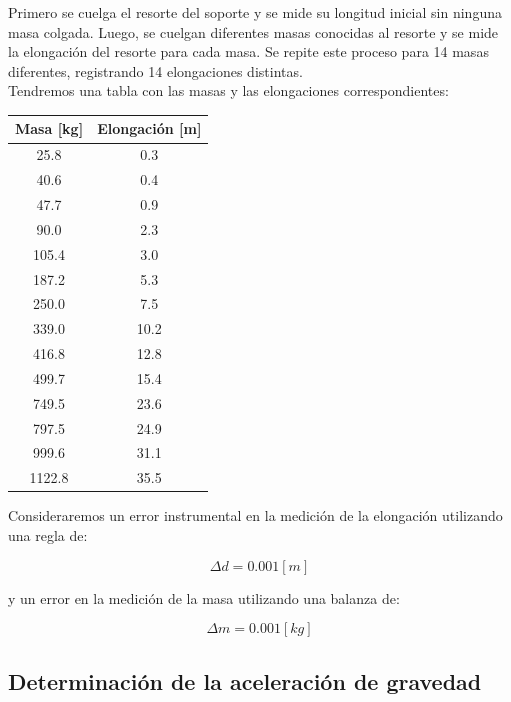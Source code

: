 \documentclass{article}
\begin{document}
\begin{multicols}{2}
    Primero se cuelga el resorte del soporte y se mide su longitud inicial sin ninguna masa colgada.
    Luego, se cuelgan diferentes masas conocidas al resorte y se mide la elongación del resorte 
    para cada masa. Se repite este proceso para 14 masas diferentes, registrando 14 elongaciones 
    distintas.
    \\ Tendremos una tabla con las masas y las elongaciones correspondientes:

    \begin{center}
        \begin{tabular}{|c|c|}
            \hline
            Masa [kg] & Elongación [m] \\
            \hline
            25.8 & 0.3 \\
            40.6 & 0.4 \\
            47.7 & 0.9 \\
            90.0 & 2.3 \\
            105.4 & 3.0 \\
            187.2 & 5.3 \\
            250.0 & 7.5 \\
            339.0 & 10.2 \\
            416.8 & 12.8 \\
            499.7 & 15.4 \\
            749.5 & 23.6 \\
            797.5 & 24.9 \\
            999.6 & 31.1 \\
            1122.8 & 35.5 \\
            \hline
        \end{tabular}
    \end{center}
    Consideraremos un error instrumental en la medición de la elongación utilizando una regla
    de:
    
    \begin{equation}
        \Delta d = 0.001 [m]
    \end{equation}
    
    y un error en la medición de la masa utilizando una balanza de: 
    
    \begin{equation}
        \Delta m = 0.001 [kg]
    \end{equation}

\subsection{Determinación de la aceleración de gravedad}


\end{multicols}
\end{document}
